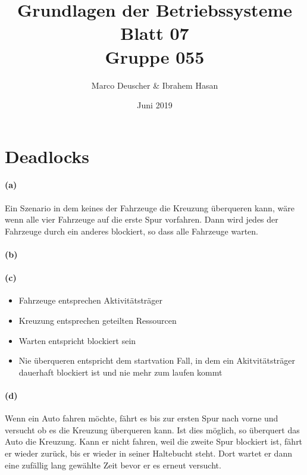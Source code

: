 \documentclass[a4paper]{article}
\title{Grundlagen der Betriebssysteme\\ Blatt 07 \\ Gruppe 055}
\author{Marco Deuscher & Ibrahem Hasan}
\date{Juni 2019}
\begin{document}
\maketitle

\section{Deadlocks}
\paragraph{(a)}
Ein Szenario in dem keines der Fahrzeuge die Kreuzung überqueren kann, wäre wenn alle vier Fahrzeuge auf die erste Spur vorfahren. Dann wird jedes der Fahrzeuge durch ein anderes blockiert, so dass alle Fahrzeuge warten.\\

\paragraph{(b)}

\paragraph{(c)}
\begin{itemize}
    \item Fahrzeuge entsprechen Aktivitätsträger
    \item Kreuzung entsprechen geteilten Ressourcen
    \item Warten entspricht blockiert sein
    \item Nie überqueren entspricht dem startvation Fall, in dem ein Akitvitätsträger dauerhaft blockiert ist und nie mehr zum laufen kommt
\end{itemize}

\paragraph{(d)}
Wenn ein Auto fahren möchte, fährt es bis zur ersten Spur nach vorne und versucht ob es die Kreuzung überqueren kann. Ist dies möglich, so überquert das Auto die Kreuzung. Kann er nicht fahren, weil die zweite Spur blockiert ist, fährt er wieder zurück, bis er wieder in seiner Haltebucht steht. Dort wartet er dann eine zufällig lang gewählte Zeit bevor er es erneut versucht.
\end{document}
